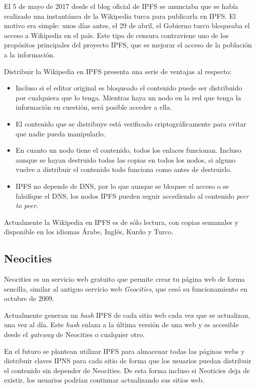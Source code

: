\documentclass[12pt]{article} %
\begin{document}
El 5 de mayo de 2017 desde el blog oficial de IPFS se anunciaba que se había realizado una instantánea de la Wikipedia turca para publicarla en IPFS. El motivo era simple: unos días antes, el 29 de abril, el Gobierno turco bloqueaba el acceso a Wikipedia en el país. Este tipo de censura contraviene uno de los propósitos principales del proyecto IPFS, que es mejorar el acceso de la población a la información.

Distribuir la Wikipedia en IPFS presenta una serie de ventajas al respecto:
\begin{itemize}
	\item Incluso si el editor original es bloqueado el contenido puede ser distribuido por cualquiera que lo tenga. Mientras haya un nodo en la red que tenga la información en cuestión, será posible acceder a ella.
	\item El contenido que se distribuye está verificado criptográficamente para evitar que nadie pueda manipularlo.
	\item En cuanto un nodo tiene el contenido, todos los enlaces funcionan. Incluso aunque se hayan destruido todas las copias en todos los nodos, si alguno vuelve a distribuir el contenido todo funciona como antes de destruirlo.
	\item IPFS no depende de DNS, por lo que aunque se bloquee el acceso o se falsifique el DNS, los nodos IPFS pueden seguir accediendo al contenido \textit{peer to peer}.
\end{itemize}

Actualmente la Wikipedia en IPFS es de sólo lectura, con copias semanales y disponible en los idiomas Árabe, Inglés, Kurdo y Turco.


\subsection{Neocities} %
\label{sub:neocities}

Neocities es un servicio web gratuito que permite crear tu página web de forma sencilla, similar al antiguo servicio web \textit{Geocities}, que cesó su funcionamiento en octubre de 2009.

Actualmente generan un \textit{hash} IPFS de cada sitio web cada vez que se actualizan, una vez al día. Este \textit{hash} enlaza a la última versión de una web y es accesible desde el \textit{gateway} de Neocities o cualquier otro. 

En el futuro se plantean utilizar IPFS para almacenar todas las páginas webs y distribuir claves IPNS para cada sitio de forma que los usuarios puedan distribuir el contenido sin depender de Neocities. De esta forma incluso si Neoticies deja de existir, los usuarios podrían continuar actualizando sus sitios web.
\end{document}
